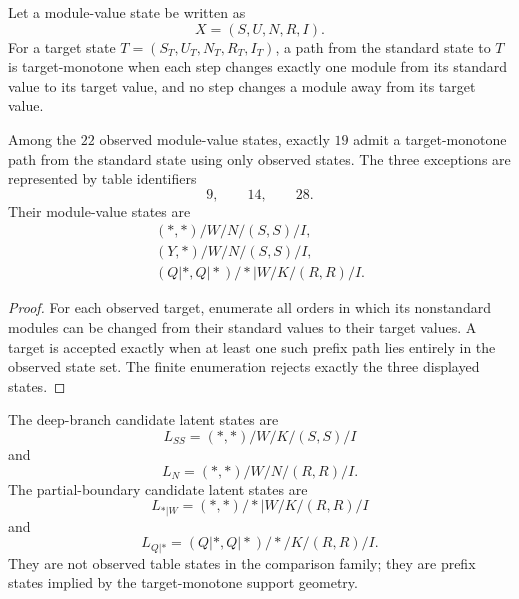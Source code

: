 \begin{definition}
\label{def:philosophy-module-value-monotone-path}
Let a module-value state be written as
$$
  X=(S,U,N,R,I).
$$
For a target state $T=(S_{T},U_{T},N_{T},R_{T},I_{T})$, a path from the
standard state to $T$ is target-monotone when each step changes exactly
one module from its standard value to its target value, and no step
changes a module away from its target value.
\end{definition}

\begin{theorem}
\label{thm:philosophy-observed-monotone-path-exceptions}
Among the $22$ observed module-value states, exactly $19$ admit a
target-monotone path from the standard state using only observed states.
The three exceptions are represented by table identifiers
$$
  9,\qquad 14,\qquad 28.
$$
Their module-value states are
$$
\begin{gathered}
  (*,*)/W/N/(S,S)/I,\\
  (Y,*)/W/N/(S,S)/I,\\
  (Q|*,Q|*)/*|W/K/(R,R)/I.
\end{gathered}
$$
\end{theorem}
\begin{proof}
For each observed target, enumerate all orders in which its nonstandard
modules can be changed from their standard values to their target
values. A target is accepted exactly when at least one such prefix path
lies entirely in the observed state set. The finite enumeration rejects
exactly the three displayed states.
\end{proof}

\begin{definition}
\label{def:philosophy-latent-completion-states}
The deep-branch candidate latent states are
$$
  L_{SS}=(*,*)/W/K/(S,S)/I
$$
and
$$
  L_{N}=(*,*)/W/N/(R,R)/I.
$$
The partial-boundary candidate latent states are
$$
  L_{*|W}=(*,*)/*|W/K/(R,R)/I
$$
and
$$
  L_{Q|*}=(Q|*,Q|*)/*/K/(R,R)/I.
$$
They are not observed table states in the comparison family; they are
prefix states implied by the target-monotone support geometry.
\end{definition}


